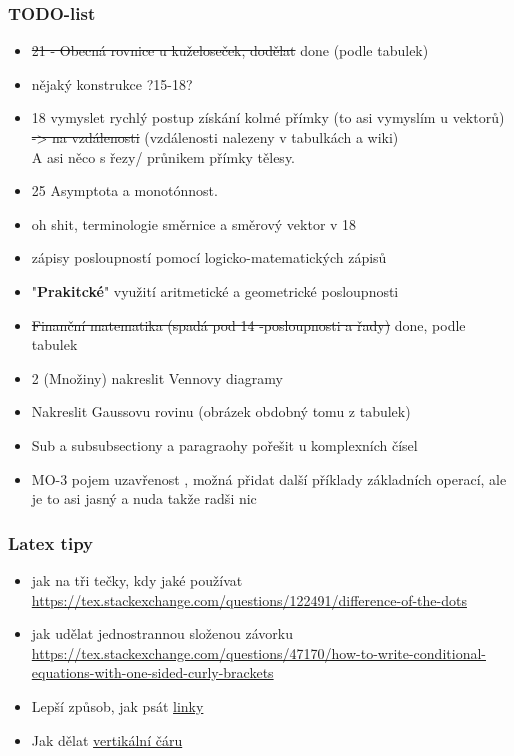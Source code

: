 \documentclass[12pt]{article}
\begin{document}
\subsubsection{TODO-list}
\begin{itemize}
\item  \st{21 - Obecná rovnice u kuželoseček, dodělat} done (podle tabulek)
\item nějaký konstrukce ?15-18?
\item 18 vymyslet rychlý postup získání kolmé přímky (to asi vymyslím u vektorů)  \st{-> na vzdálenosti} (vzdálenosti nalezeny v tabulkách a wiki)\\ A asi něco s řezy/ průnikem přímky tělesy.
\item 25 Asymptota a monotónnost.
\item oh shit, terminologie směrnice a směrový vektor v 18
\item zápisy posloupností pomocí logicko-matematických zápisů
\item "\textbf{Prakitcké}" využití aritmetické a geometrické posloupnosti
\item \st{Finanční matematika (spadá pod 14 -posloupnosti a řady)} done, podle tabulek
\item 2 (Množiny) nakreslit Vennovy diagramy
\item Nakreslit Gaussovu rovinu (obrázek obdobný tomu z tabulek)
\item Sub a subsubsectiony a paragraohy pořešit u komplexních čísel
\item MO-3 pojem uzavřenost , možná přidat další příklady základních operací, ale je to asi jasný a nuda takže radši nic
\end{itemize}
\subsubsection{Latex tipy}
\begin{itemize}
\item jak na tři tečky, kdy jaké používat \url{https://tex.stackexchange.com/questions/122491/difference-of-the-dots}
\item jak udělat jednostrannou složenou závorku \url{https://tex.stackexchange.com/questions/47170/how-to-write-conditional-equations-with-one-sided-curly-brackets}
\item Lepší způsob, jak psát \href{https://www.latex-tutorial.com/tutorials/hyperlinks/}{linky}
\item Jak dělat \href{https://tex.stackexchange.com/questions/498/mid-vertical-bar-vert-lvert-rvert-divides}{vertikální čáru}
\end{itemize}
\end{document}
